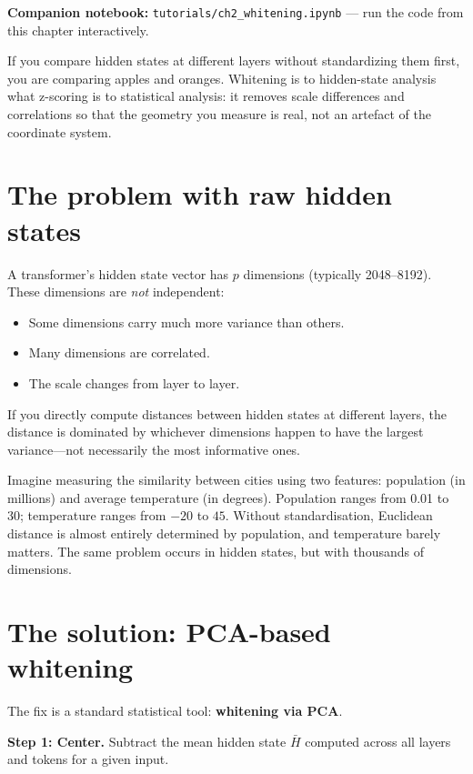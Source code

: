 \documentclass[11pt, twoside, openright]{memoir}
\newcommand{\notebook}[1]{%
  \begin{tcolorbox}[enhanced, colback=LBlue!30, colframe=Blue!60,
    left=4pt, right=4pt, top=3pt, bottom=3pt, boxrule=0.6pt, arc=2pt,
    before skip=6pt, after skip=10pt]
    {\small\sffamily\color{Navy} \textbf{Companion notebook:}
    \texttt{tutorials/#1} --- run the code from this chapter interactively.}
  \end{tcolorbox}%
}
\begin{document}
\notebook{ch2\_whitening.ipynb}

\begin{whycare}
If you compare hidden states at different layers without standardizing them
first, you are comparing apples and oranges. Whitening is to hidden-state
analysis what z-scoring is to statistical analysis: it removes scale
differences and correlations so that the geometry you measure is real, not an
artefact of the coordinate system.
\end{whycare}

\section{The problem with raw hidden states}

A transformer's hidden state vector has $p$ dimensions (typically 2048--8192).
These dimensions are \emph{not} independent:
\begin{itemize}[nosep]
\item Some dimensions carry much more variance than others.
\item Many dimensions are correlated.
\item The scale changes from layer to layer.
\end{itemize}

If you directly compute distances between hidden states at different layers,
the distance is dominated by whichever dimensions happen to have the largest
variance---not necessarily the most informative ones.

\begin{analogy}
Imagine measuring the similarity between cities using two features: population
(in millions) and average temperature (in degrees). Population ranges from
0.01 to 30; temperature ranges from $-20$ to $45$. Without standardisation,
Euclidean distance is almost entirely determined by population, and temperature
barely matters. The same problem occurs in hidden states, but with thousands
of dimensions.
\end{analogy}

\section{The solution: PCA-based whitening}

The fix is a standard statistical tool: \textbf{whitening via PCA}.

\textbf{Step 1: Center.} Subtract the mean hidden state $\bar{H}$ computed
across all layers and tokens for a given input.
\end{document}
